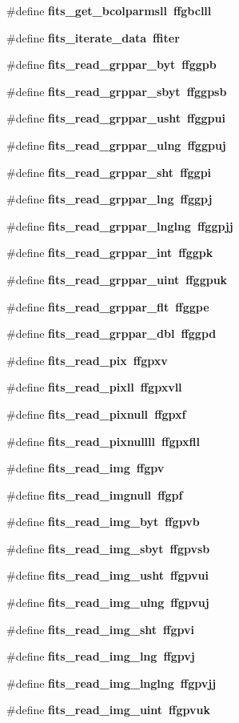 \begin{CompactItemize}
\item 
\#define \bf{fits\_\-get\_\-bcolparmsll}~ffgbclll
\item 
\#define \bf{fits\_\-iterate\_\-data}~ffiter
\item 
\#define \bf{fits\_\-read\_\-grppar\_\-byt}~ffggpb
\item 
\#define \bf{fits\_\-read\_\-grppar\_\-sbyt}~ffggpsb
\item 
\#define \bf{fits\_\-read\_\-grppar\_\-usht}~ffggpui
\item 
\#define \bf{fits\_\-read\_\-grppar\_\-ulng}~ffggpuj
\item 
\#define \bf{fits\_\-read\_\-grppar\_\-sht}~ffggpi
\item 
\#define \bf{fits\_\-read\_\-grppar\_\-lng}~ffggpj
\item 
\#define \bf{fits\_\-read\_\-grppar\_\-lnglng}~ffggpjj
\item 
\#define \bf{fits\_\-read\_\-grppar\_\-int}~ffggpk
\item 
\#define \bf{fits\_\-read\_\-grppar\_\-uint}~ffggpuk
\item 
\#define \bf{fits\_\-read\_\-grppar\_\-flt}~ffggpe
\item 
\#define \bf{fits\_\-read\_\-grppar\_\-dbl}~ffggpd
\item 
\#define \bf{fits\_\-read\_\-pix}~ffgpxv
\item 
\#define \bf{fits\_\-read\_\-pixll}~ffgpxvll
\item 
\#define \bf{fits\_\-read\_\-pixnull}~ffgpxf
\item 
\#define \bf{fits\_\-read\_\-pixnullll}~ffgpxfll
\item 
\#define \bf{fits\_\-read\_\-img}~ffgpv
\item 
\#define \bf{fits\_\-read\_\-imgnull}~ffgpf
\item 
\#define \bf{fits\_\-read\_\-img\_\-byt}~ffgpvb
\item 
\#define \bf{fits\_\-read\_\-img\_\-sbyt}~ffgpvsb
\item 
\#define \bf{fits\_\-read\_\-img\_\-usht}~ffgpvui
\item 
\#define \bf{fits\_\-read\_\-img\_\-ulng}~ffgpvuj
\item 
\#define \bf{fits\_\-read\_\-img\_\-sht}~ffgpvi
\item 
\#define \bf{fits\_\-read\_\-img\_\-lng}~ffgpvj
\item 
\#define \bf{fits\_\-read\_\-img\_\-lnglng}~ffgpvjj
\item 
\#define \bf{fits\_\-read\_\-img\_\-uint}~ffgpvuk
\item 

\end{CompactItemize}
